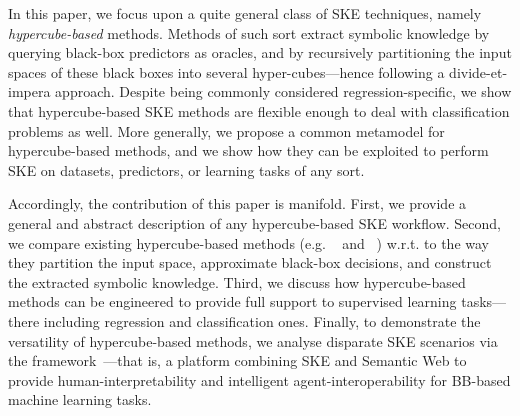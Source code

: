 \documentclass[
]{ceurart}
\begin{document}
In this paper, we focus upon a quite general class of SKE techniques, namely \emph{hypercube-based} methods.
%
Methods of such sort extract symbolic knowledge by querying black-box predictors as oracles, and by recursively partitioning the input spaces of these black boxes into several hyper-cubes---hence following a divide-et-impera approach.
%
Despite being commonly considered regression-specific, we show that hypercube-based SKE methods are flexible enough to deal with classification problems as well.
%
More generally, we propose a common metamodel for hypercube-based methods, and we show how they can be exploited to perform SKE on datasets, predictors, or learning tasks of any sort.

Accordingly, the contribution of this paper is manifold.
%
First, we provide a general and abstract description of any hypercube-based SKE workflow.
%
Second, we compare existing hypercube-based methods (e.g. \iter{}~\cite{huysmans2006iter} and \gridex{}~\cite{gridex-extraamas2021}) w.r.t. to the way they partition the input space, approximate black-box decisions, and construct the extracted symbolic knowledge.
%
Third, we discuss how hypercube-based methods can be engineered to provide full support to supervised learning tasks---there including regression and classification ones.
%
Finally, to 
%
demonstrate the versatility of hypercube-based methods, we analyse disparate SKE scenarios via the \psyke{} framework~\cite{psyke-woa2021,psyke-ia2022,psyke-extraamas2022}---that is, a platform combining SKE and Semantic Web to provide human-interpretability and intelligent agent-interoperability for BB-based machine learning tasks.
%
%
\end{document}
